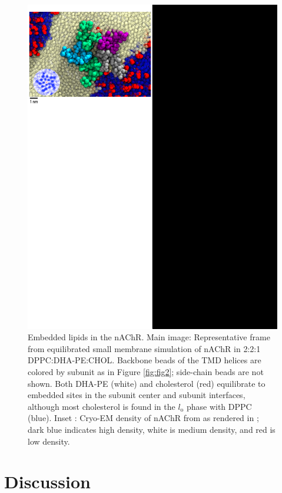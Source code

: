 \documentclass[final,3p,times,twocolumn]{elsarticle}
\newcommand{\lo}{l_{\mathrm{o}}}
\begin{document}
	\begin{figure}[h!]
		\center
		\includegraphics[width=1\linewidth]{Summary.pdf}
		\caption{ Embedded lipids in the nAChR. Main image: Representative frame from equilibrated small membrane simulation of nAChR in 2:2:1 DPPC:DHA-PE:CHOL. Backbone beads of the TMD helices are colored by subunit as in Figure \ref{fig:fig2}; side-chain beads are not shown.  Both DHA-PE (white) and cholesterol (red) equilibrate to embedded sites in the subunit center and subunit interfaces, although most cholesterol is found in the $\lo$ phase with DPPC (blue). Inset : Cryo-EM density of nAChR from \cite{Miyazawa2003} as rendered in \cite{Brannigan_Embedded_2008}; dark blue indicates high density, white is medium density, and red is low density. } 
		\label{fig:sum}
	\end{figure}

	 
 \section{Discussion}
\label{S:4}
\end{document}

